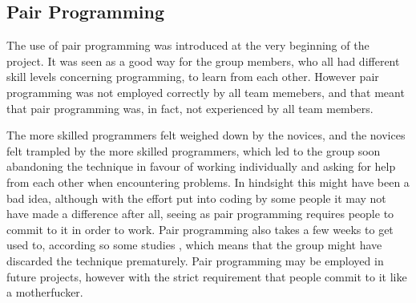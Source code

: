 \subsection{Pair Programming}
The use of pair programming was introduced at the very beginning of the project. It was seen as a good way for the group
members, who all had different skill levels concerning programming, to learn from each other. However pair programming was not
employed correctly by all team memebers, and that meant that pair programming was, in fact, not experienced by all team
members. 

The more skilled programmers felt weighed down by the novices, and the novices felt trampled by the more skilled
programmers, which led to the group soon abandoning the technique in favour of working individually and asking for help from
each other when encountering problems. In hindsight this might have been a bad idea, although with the effort put into coding
by some people it may not have made a difference after all, seeing as pair programming requires people to commit to it in
order to work. Pair programming also takes a few weeks to get used to, according so some studies \cite{cockburn00}, which means that the group
might have discarded the technique prematurely. Pair programming may be employed in future projects, however with the strict
requirement that people commit to it like a motherfucker.